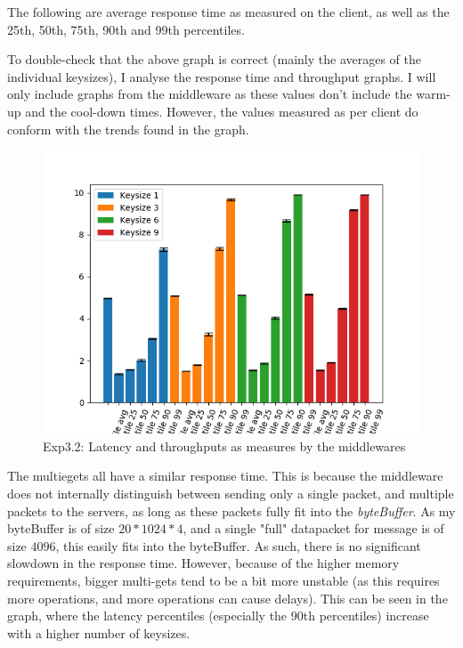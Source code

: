 \documentclass[11pt,a4paper]{article}
\begin{document}
The following are average response time as measured on the client, as well as the 25th, 50th, 75th, 90th and 99th percentiles.

To double-check that the above graph is correct (mainly the averages of the individual keysizes), I analyse the response time and throughput graphs.
I will only include graphs from the middleware as these values don't include the warm-up and the cool-down times.
However, the values measured as per client do conform with the trends found in the graph. 

\begin{figure}[H]
\centering
\includegraphics[width=\textwidth]{img/exp5_1/exp5_1_client_percentile_plots_sharded_True.png}
\caption{Exp3.2: Latency and throughputs as measures by the middlewares}
\label{fig:test}
\end{figure}

The multiegets all have a similar response time.
This is because the middleware does not internally distinguish between sending only a single packet, and multiple packets to the servers, as long as these packets fully fit into the \textit{byteBuffer}.
As my byteBuffer is of size $20 * 1024 * 4$, and a single "full" datapacket for message is of size $ 4096 $, this easily fits into the byteBuffer.
As such, there is no significant slowdown in the response time.
However, because of the higher memory requirements, bigger multi-gets tend to be a bit more unstable (as this requires more operations, and more operations can cause delays).
This can be seen in the graph, where the latency percentiles (especially the 90th percentiles) increase with a higher number of keysizes. \\
\end{document}
